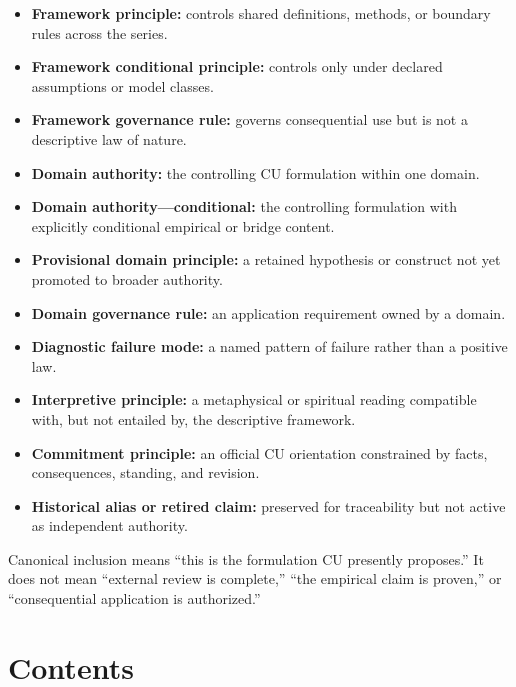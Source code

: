 \documentclass[
  11pt,
]{article}
\providecommand{\tightlist}{%
  \setlength{\itemsep}{0pt}\setlength{\parskip}{0pt}}
\begin{document}
\begin{itemize}
\tightlist
\item
  \textbf{Framework principle:} controls shared definitions, methods, or
  boundary rules across the series.
\item
  \textbf{Framework conditional principle:} controls only under declared
  assumptions or model classes.
\item
  \textbf{Framework governance rule:} governs consequential use but is
  not a descriptive law of nature.
\item
  \textbf{Domain authority:} the controlling CU formulation within one
  domain.
\item
  \textbf{Domain authority---conditional:} the controlling formulation
  with explicitly conditional empirical or bridge content.
\item
  \textbf{Provisional domain principle:} a retained hypothesis or
  construct not yet promoted to broader authority.
\item
  \textbf{Domain governance rule:} an application requirement owned by a
  domain.
\item
  \textbf{Diagnostic failure mode:} a named pattern of failure rather
  than a positive law.
\item
  \textbf{Interpretive principle:} a metaphysical or spiritual reading
  compatible with, but not entailed by, the descriptive framework.
\item
  \textbf{Commitment principle:} an official CU orientation constrained
  by facts, consequences, standing, and revision.
\item
  \textbf{Historical alias or retired claim:} preserved for traceability
  but not active as independent authority.
\end{itemize}

Canonical inclusion means ``this is the formulation CU presently
proposes.'' It does not mean ``external review is complete,'' ``the
empirical claim is proven,'' or ``consequential application is
authorized.''

\section{Contents}\label{contents}
\end{document}
